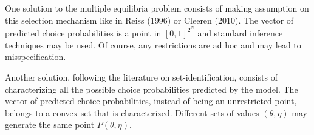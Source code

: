One solution to the multiple equilibria problem consists of making assumption on this selection mechanism like in Reiss (1996) or Cleeren (2010). The vector of predicted choice probabilities is a point in $[0,1]^{2^N}$ and standard inference techniques may be used. Of course, any restrictions are ad hoc and may lead to misspecification. 

Another solution, following the literature on set-identification, consists of characterizing all the possible choice probabilities predicted by the model. The vector of predicted choice probabilities, instead of being an unrestricted point, belongs to a convex set that is characterized. Different sets of values $(\theta, \eta)$ may generate the same point $P(\theta,\eta)$. 




